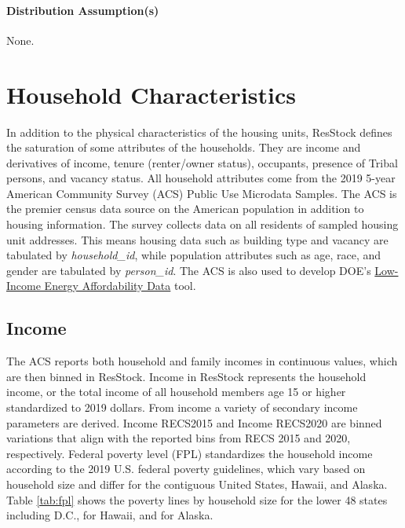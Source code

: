 \paragraph{Distribution Assumption(s)}
None. 

\section{Household Characteristics}

In addition to the physical characteristics of the housing units, ResStock defines the saturation of some attributes of the households. They are income and derivatives of income, tenure (renter/owner status), occupants, presence of Tribal persons, and vacancy status. All household attributes come from the 2019 5-year American Community Survey (ACS) Public Use Microdata Samples. The ACS is the premier census data source on the American population in addition to housing information. The survey collects data on all residents of sampled housing unit addresses. This means housing data such as building type and vacancy are tabulated by \textit{household\_id}, while population attributes such as age, race, and gender are tabulated by \textit{person\_id}. The ACS is also used to develop DOE’s \href{https://www.energy.gov/scep/slsc/lead-tool}{Low-Income Energy Affordability Data} tool.

\subsection{Income}
The ACS reports both household and family incomes in continuous values, which are then binned in ResStock. Income in ResStock represents the household income, or the total income of all household members age 15 or higher standardized to 2019 dollars. From income a variety of secondary income parameters are derived. Income RECS2015 and Income RECS2020 are binned variations that align with the reported bins from RECS 2015 and 2020, respectively. Federal poverty level (FPL) standardizes the household income according to the 2019 U.S. federal poverty guidelines, which vary based on household size and differ for the contiguous United States, Hawaii, and Alaska. Table \ref{tab:fpl} shows the poverty lines by household size for the lower 48 states including D.C., for Hawaii, and for Alaska.


